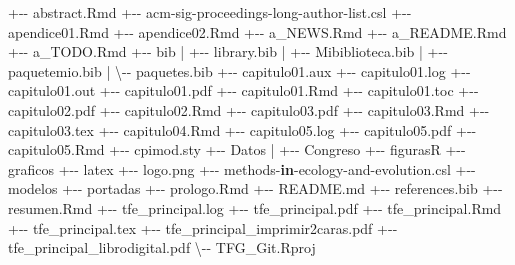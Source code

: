 \documentclass[12pt,a4paper,]{book}
\newenvironment{Shaded}{\begin{snugshade}}{\end{snugshade}}
\newcommand{\ControlFlowTok}[1]{\textcolor[rgb]{0.13,0.29,0.53}{\textbf{#1}}}
\newcommand{\NormalTok}[1]{#1}
\newcommand{\SpecialCharTok}[1]{\textcolor[rgb]{0.00,0.00,0.00}{#1}}
\numberwithin{dummy}{section}
\theoremstyle{ocrenumbox}
\theoremstyle{blacknumex}
\theoremstyle{blacknumbox}
\theoremstyle{ocrenum}
\theoremstyle{ocrenum}
\begin{document}
\begin{Shaded}
\begin{Highlighting}[]
\SpecialCharTok{+{-}{-}}\NormalTok{ abstract.Rmd}
\SpecialCharTok{+{-}{-}}\NormalTok{ acm}\SpecialCharTok{{-}}\NormalTok{sig}\SpecialCharTok{{-}}\NormalTok{proceedings}\SpecialCharTok{{-}}\NormalTok{long}\SpecialCharTok{{-}}\NormalTok{author}\SpecialCharTok{{-}}\NormalTok{list.csl}
\SpecialCharTok{+{-}{-}}\NormalTok{ apendice01.Rmd}
\SpecialCharTok{+{-}{-}}\NormalTok{ apendice02.Rmd}
\SpecialCharTok{+{-}{-}}\NormalTok{ a\_NEWS.Rmd}
\SpecialCharTok{+{-}{-}}\NormalTok{ a\_README.Rmd}
\SpecialCharTok{+{-}{-}}\NormalTok{ a\_TODO.Rmd}
\SpecialCharTok{+{-}{-}}\NormalTok{ bib}
\SpecialCharTok{|}   \SpecialCharTok{+{-}{-}}\NormalTok{ library.bib}
\SpecialCharTok{|}   \SpecialCharTok{+{-}{-}}\NormalTok{ Mibiblioteca.bib}
\SpecialCharTok{|}   \SpecialCharTok{+{-}{-}}\NormalTok{ paquetemio.bib}
\SpecialCharTok{|}\NormalTok{   \textbackslash{}}\SpecialCharTok{{-}{-}}\NormalTok{ paquetes.bib}
\SpecialCharTok{+{-}{-}}\NormalTok{ capitulo01.aux}
\SpecialCharTok{+{-}{-}}\NormalTok{ capitulo01.log}
\SpecialCharTok{+{-}{-}}\NormalTok{ capitulo01.out}
\SpecialCharTok{+{-}{-}}\NormalTok{ capitulo01.pdf}
\SpecialCharTok{+{-}{-}}\NormalTok{ capitulo01.Rmd}
\SpecialCharTok{+{-}{-}}\NormalTok{ capitulo01.toc}
\SpecialCharTok{+{-}{-}}\NormalTok{ capitulo02.pdf}
\SpecialCharTok{+{-}{-}}\NormalTok{ capitulo02.Rmd}
\SpecialCharTok{+{-}{-}}\NormalTok{ capitulo03.pdf}
\SpecialCharTok{+{-}{-}}\NormalTok{ capitulo03.Rmd}
\SpecialCharTok{+{-}{-}}\NormalTok{ capitulo03.tex}
\SpecialCharTok{+{-}{-}}\NormalTok{ capitulo04.Rmd}
\SpecialCharTok{+{-}{-}}\NormalTok{ capitulo05.log}
\SpecialCharTok{+{-}{-}}\NormalTok{ capitulo05.pdf}
\SpecialCharTok{+{-}{-}}\NormalTok{ capitulo05.Rmd}
\SpecialCharTok{+{-}{-}}\NormalTok{ cpimod.sty}
\SpecialCharTok{+{-}{-}}\NormalTok{ Datos}
\SpecialCharTok{|}   \SpecialCharTok{+{-}{-}}\NormalTok{ Congreso}
\SpecialCharTok{+{-}{-}}\NormalTok{ figurasR}
\SpecialCharTok{+{-}{-}}\NormalTok{ graficos}
\SpecialCharTok{+{-}{-}}\NormalTok{ latex}
\SpecialCharTok{+{-}{-}}\NormalTok{ logo.png}
\SpecialCharTok{+{-}{-}}\NormalTok{ methods}\SpecialCharTok{{-}}\ControlFlowTok{in}\SpecialCharTok{{-}}\NormalTok{ecology}\SpecialCharTok{{-}}\NormalTok{and}\SpecialCharTok{{-}}\NormalTok{evolution.csl}
\SpecialCharTok{+{-}{-}}\NormalTok{ modelos}
\SpecialCharTok{+{-}{-}}\NormalTok{ portadas}
\SpecialCharTok{+{-}{-}}\NormalTok{ prologo.Rmd}
\SpecialCharTok{+{-}{-}}\NormalTok{ README.md}
\SpecialCharTok{+{-}{-}}\NormalTok{ references.bib}
\SpecialCharTok{+{-}{-}}\NormalTok{ resumen.Rmd}
\SpecialCharTok{+{-}{-}}\NormalTok{ tfe\_principal.log}
\SpecialCharTok{+{-}{-}}\NormalTok{ tfe\_principal.pdf}
\SpecialCharTok{+{-}{-}}\NormalTok{ tfe\_principal.Rmd}
\SpecialCharTok{+{-}{-}}\NormalTok{ tfe\_principal.tex}
\SpecialCharTok{+{-}{-}}\NormalTok{ tfe\_principal\_imprimir2caras.pdf}
\SpecialCharTok{+{-}{-}}\NormalTok{ tfe\_principal\_librodigital.pdf}
\NormalTok{\textbackslash{}}\SpecialCharTok{{-}{-}}\NormalTok{ TFG\_Git.Rproj}
\end{Highlighting}
\end{Shaded}
\end{document}
